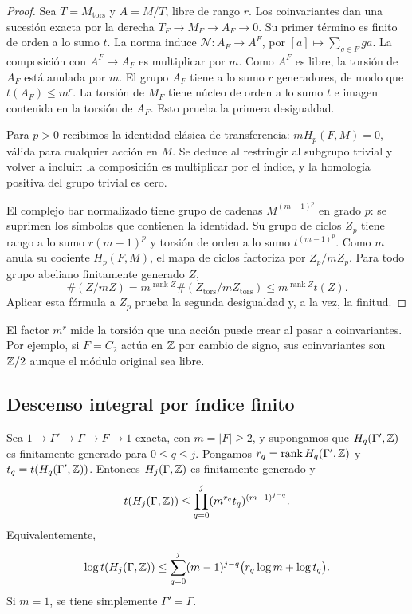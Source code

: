 \begin{proof}
Sea $T=M_{\mathrm{tors}}$ y $A=M/T$, libre de rango $r$.
Los coinvariantes dan una sucesión exacta por la derecha
$T_F\to M_F\to A_F\to0$. Su primer término es finito
de orden a lo sumo $t$. La norma induce
$\mathcal N:A_F\to A^F$, por
$[a]\mapsto\sum_{g\in F}ga$.
La composición con $A^F\to A_F$ es multiplicar por $m$.
Como $A^F$ es libre, la torsión de $A_F$ está anulada por $m$.
El grupo $A_F$ tiene a lo sumo $r$ generadores, de modo que
$t(A_F)\le m^r$. La torsión de $M_F$ tiene núcleo de orden
a lo sumo $t$ e imagen contenida en la torsión de $A_F$.
Esto prueba la primera desigualdad.

Para $p>0$ recibimos la identidad clásica de transferencia:
$mH_p(F,M)=0$, válida para cualquier acción en $M$.
Se deduce al restringir al subgrupo trivial y volver a incluir:
la composición es multiplicar por el índice, y la homología
positiva del grupo trivial es cero.

El complejo bar normalizado tiene grupo de cadenas
$M^{(m-1)^p}$ en grado $p$: se suprimen los símbolos que
contienen la identidad. Su grupo de ciclos $Z_p$ tiene rango
a lo sumo $r(m-1)^p$ y torsión de orden a lo sumo
$t^{(m-1)^p}$. Como $m$ anula su cociente $H_p(F,M)$,
el mapa de ciclos factoriza por $Z_p/mZ_p$. Para todo grupo
abeliano finitamente generado $Z$,
\[
 \#(Z/mZ)=m^{\operatorname{rank}Z}\#(Z_{\mathrm{tors}}/mZ_{\mathrm{tors}})
 \le m^{\operatorname{rank}Z}t(Z).
\]
Aplicar esta fórmula a $Z_p$ prueba la segunda desigualdad
y, a la vez, la finitud.
\end{proof}

El factor $m^r$ mide la torsión que una acción puede crear al
pasar a coinvariantes. Por ejemplo, si $F=C_2$ actúa en $\mathbb{Z}$
por cambio de signo, sus coinvariantes son $\mathbb{Z}/2$ aunque
el módulo original sea libre.

\clearpage
\subsection{Descenso integral por índice finito}

\begin{teorema}
\label{thm:ti-descenso}
Sea $1\to\Gamma'\to\Gamma\to F\to1$ exacta, con
$m=|F|\ge2$, y supongamos que $H_q(\Gamma',\mathbb{Z})$ es
finitamente generado para $0\le q\le j$.
Pongamos
$r_q=\operatorname{rank}H_q(\Gamma',\mathbb{Z})$ y
$t_q=t(H_q(\Gamma',\mathbb{Z}))$. Entonces $H_j(\Gamma,\mathbb{Z})$ es
finitamente generado y
\begin{equation}
 t(H_j(\Gamma,\mathbb{Z}))
 \le\prod_{q=0}^j(m^{r_q}t_q)^{(m-1)^{j-q}}.
 \label{eq:ti-descenso}
\end{equation}
Equivalentemente,
\begin{equation}
 \log t(H_j(\Gamma,\mathbb{Z}))
 \le\sum_{q=0}^j(m-1)^{j-q}
          \bigl(r_q\log m+\log t_q\bigr).
 \label{eq:ti-descenso-log}
\end{equation}
Si $m=1$, se tiene simplemente $\Gamma'=\Gamma$.
\end{teorema}

